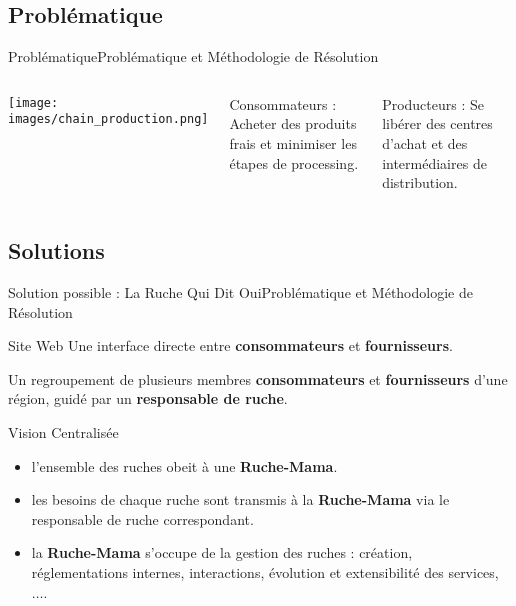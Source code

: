 \documentclass[usenames,dvipsnames]{beamer}
\begin{document}
\subsection{Problématique}
\begin{frame}{Problématique}{Problématique et Méthodologie de Résolution}
\begin{columns}[onlytextwidth, T]
  \column{55mm}
    \texttt{[image: images/chain\_production.png]}

  \column{\dimexpr\linewidth-40mm-2mm}
    \begin{block}{Consommateurs :}
    Acheter des produits frais et minimiser les étapes de processing.
    \end{block}

    \begin{block}{Producteurs :}
    Se libérer des centres d'achat et des intermédiaires de distribution.
    \end{block}
\end{columns}
\end{frame}

\subsection{Solutions}
\begin{frame}{Solution possible : La Ruche Qui Dit Oui}{Problématique et Méthodologie de Résolution}
\begin{block}{Site Web}
Une interface directe entre \textbf{consommateurs} et \textbf{fournisseurs}.
\end{block}

\begin{definition}[Ruche]
Un regroupement de plusieurs membres \textbf{consommateurs} et \textbf{fournisseurs} d'une région, guidé par un \textbf{responsable de ruche}.
\end{definition}

\begin{block}{Vision Centralisée}
\begin{itemize}
  \item l'ensemble des ruches obeit à une \textbf{Ruche-Mama}.
  \item les besoins de chaque ruche sont transmis à la \textbf{Ruche-Mama} via le responsable de ruche correspondant.
  \item la \textbf{Ruche-Mama} s'occupe de la gestion des ruches : création, réglementations internes, interactions, évolution et extensibilité des services, $\dots$.
\end{itemize}
\end{block}
\end{frame}
\end{document}
